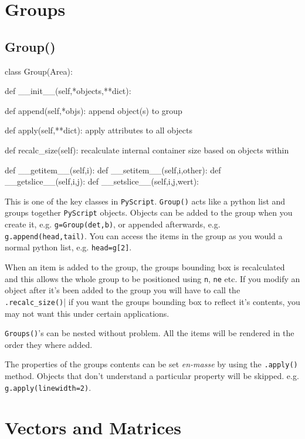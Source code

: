 \documentclass[a4paper]{book}
\begin{document}
\section{Groups}

\subsection{Group()}
\label{sec:group}
\begin{python}
class Group(Area):

    def __init__(self,*objects,**dict):

    def append(self,*objs):
        append object(s) to group

    def apply(self,**dict):
        apply attributes to all objects

    def recalc_size(self):
        recalculate internal container size based on objects within

    def __getitem__(self,i):
    def __setitem__(self,i,other):
    def __getslice__(self,i,j):
    def __setslice__(self,i,j,wert):
\end{python}

This is one of the key classes in \Verb|PyScript|. \Verb|Group()| acts
like a python list and groups together  \Verb|PyScript| objects. Objects
can be added to the group when you create it, e.g. \Verb|g=Group(det,b)|,
or appended afterwards, e.g. \Verb|g.append(head,tail)|. You can access the 
items in the group as you would a normal python list, e.g. \Verb|head=g[2]|.

When an item is added to the group, the groups bounding box is recalculated
and this allows the whole group to be positioned using \Verb|n|, \Verb|ne|
etc. If you modify an object after it's been added to the group you will
have to call the \Verb|.recalc_size()|| if you want the groups bounding box
to reflect it's contents, you may not want this under certain applications. 

\Verb|Groups()|'s can be nested without problem. All the items will be
rendered in the order they where added. 

The properties of the groups contents can be set \emph{en-masse} by
using the \Verb|.apply()| method. Objects that don't understand a
particular property will be skipped. e.g. \Verb|g.apply(linewidth=2)|.



\section{Vectors and Matrices}
\end{document}
